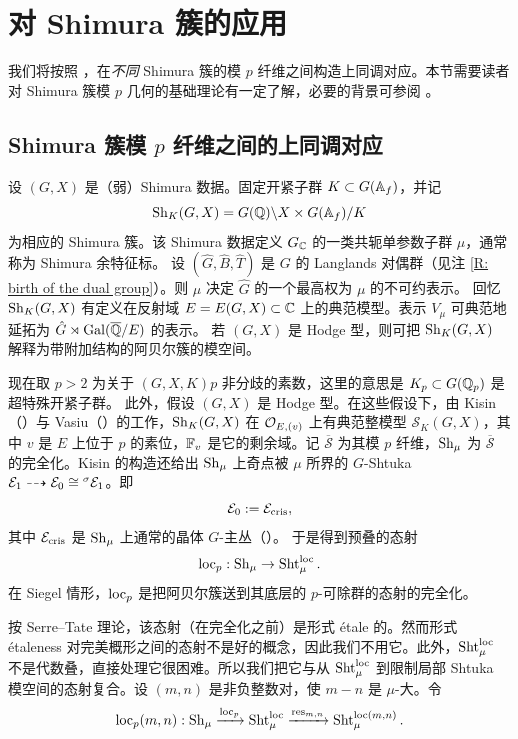 \section{对 Shimura 簇的应用}
\label{S:app to Sh}
我们将按照 \cite[\S 7]{XZ}，在\emph{不同} Shimura 簇的模 $p$ 纤维之间构造上同调对应。本节需要读者对 Shimura 簇模 $p$ 几何的基础理论有一定了解，必要的背景可参阅 \cite[\S 7.1, \S 7.2]{XZ}。

\subsection{Shimura 簇模 $p$ 纤维之间的上同调对应}

设 $(G,X)$ 是（弱）Shimura 数据。固定开紧子群 $K\subset G({\mathbb A}_f)$，并记
\[\operatorname{Sh}_K(G,X)=G({\mathbb Q})\backslash X\times G({\mathbb A}_f)/K\]
为相应的 Shimura 簇。该 Shimura 数据定义 $G_{\mathbb C}$ 的一类共轭单参数子群 $\mu$，通常称为 Shimura 余特征标。
设 $(\hat G,\hat B,\hat T)$ 是 $G$ 的 Langlands 对偶群（见注 \ref{R: birth of the dual group}）。则 $\mu$ 决定 $\hat G$ 的一个最高权为 $\mu$ 的不可约表示。
回忆 $\operatorname{Sh}_K(G,X)$ 有定义在反射域 $E=E(G,X)\subset {\mathbb C}$ 上的典范模型。表示 $V_\mu$ 可典范地延拓为 $\hat G\rtimes {\operatorname{Gal}}(\overline{{\mathbb Q}}/E)$ 的表示。
若 $(G,X)$ 是 Hodge 型，则可把 $\operatorname{Sh}_K(G,X)$ 解释为带附加结构的阿贝尔簇的模空间。

现在取 $p>2$ 为关于 $(G,X,K)$$p$ 非分歧的素数，这里的意思是 $K_p\subset G({\mathbb Q}_p)$ 是超特殊开紧子群。
此外，假设 $(G,X)$ 是 Hodge 型。在这些假设下，由 Kisin（\cite{Ki}）与 Vasiu（\cite{Vasiu}）的工作，$\operatorname{Sh}_K(G,X)$ 在 ${\mathcal O}_{E,(v)}$ 上有典范整模型 $\mathscr S_K(G,X)$，其中 $v$ 是 $E$ 上位于 $p$ 的素位，$\mathbb{F}_v$ 是它的剩余域。记 $\overline{\mathscr S}$ 为其模 $p$ 纤维，$\operatorname{Sh}_\mu$ 为 $\overline{\mathscr S}$ 的完全化。Kisin 的构造还给出 $\operatorname{Sh}_\mu$ 上奇点被 $\mu$ 所界的 $G$-Shtuka ${\mathcal E}_1\dashrightarrow {\mathcal E}_0\cong {^\sigma}{\mathcal E}_1$。即
\[{\mathcal E}_0:={\mathcal E}_{\operatorname{cris}},\]
其中 ${\mathcal E}_{\operatorname{cris}}$ 是 $\operatorname{Sh}_\mu$ 上通常的晶体 $G$-主丛（\cite[推论 7.1.14]{XZ}）。
于是得到预叠的态射
\[\mathrm{loc}_p: \operatorname{Sh}_{\mu}\to \operatorname{Sht}_{\mu}^{\mathrm{loc}}.\]
在 Siegel 情形，$\mathrm{loc}_p$ 是把阿贝尔簇送到其底层的 $p$-可除群的态射的完全化。

按 Serre–Tate 理论，该态射（在完全化之前）是形式 \'etale 的。然而形式 \'etaleness 对完美概形之间的态射不是好的概念，因此我们不用它。此外，$\operatorname{Sht}_\mu^{\mathrm{loc}}$ 不是代数叠，直接处理它很困难。所以我们把它与从 $\operatorname{Sht}_{\mu}^{\mathrm{loc}}$ 到限制局部 Shtuka 模空间的态射复合。设 $(m,n)$ 是非负整数对，使 $m-n$ 是 $\mu$-大。令
\[\mathrm{loc}_p(m,n):\operatorname{Sh}_{\mu}\xrightarrow{\mathrm{loc}_p} \operatorname{Sht}_{\mu}^{\mathrm{loc}}\xrightarrow{{\operatorname{res}}_{m,n}} \operatorname{Sht}_{\mu}^{\mathrm{loc}(m,n)}.\]

